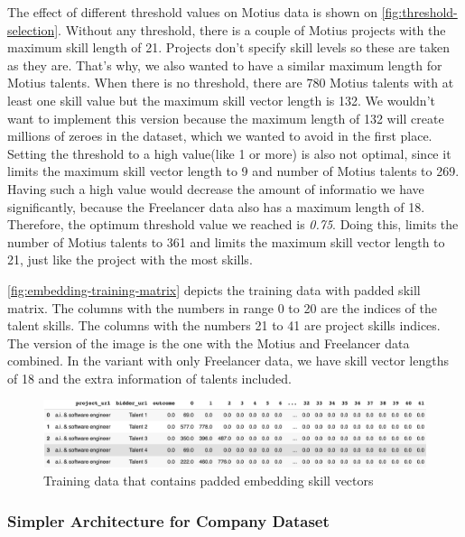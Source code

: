 The effect of different threshold values on Motius data is shown on \autoref{fig:threshold-selection}. Without any threshold, there is a couple of Motius projects with the maximum skill length of 21. Projects don't specify skill levels so these are taken as they are. That's why, we also wanted to have a similar maximum length for Motius talents. When there is no threshold, there are 780 Motius talents with at least one skill value but the maximum skill vector length is 132. We wouldn't want to implement this version because the maximum length of 132 will create millions of zeroes in the dataset, which we wanted to avoid in the first place. Setting the threshold to a high value(like 1 or more) is also not optimal, since it limits the maximum skill vector length to 9 and number of Motius talents to 269. Having such a high value would decrease the amount of informatio we have significantly,  because the Freelancer data also has a maximum length of 18. Therefore, the optimum threshold value we reached is \textit{0.75}. Doing this, limits the number of Motius talents to 361 and limits the maximum skill vector length to 21, just like the project with the most skills.

\autoref{fig:embedding-training-matrix} depicts the training data with padded skill matrix. The columns with the numbers in range 0 to 20 are the indices of the talent skills. The columns with the numbers 21 to 41 are project skills indices.  The version of the image is the one with the Motius and Freelancer data combined. In the variant with only Freelancer data, we have skill vector lengths of 18 and the extra information of talents included.

 \begin{figure}[!ht]
	\centering
	\includegraphics[width=\textwidth]{figures/EmbeddingTrainingMatrix.png}
	\caption{Training data that contains padded embedding skill vectors}
	\label{fig:embedding-training-matrix}
\end{figure}



\subsubsection{Simpler Architecture for Company Dataset}

